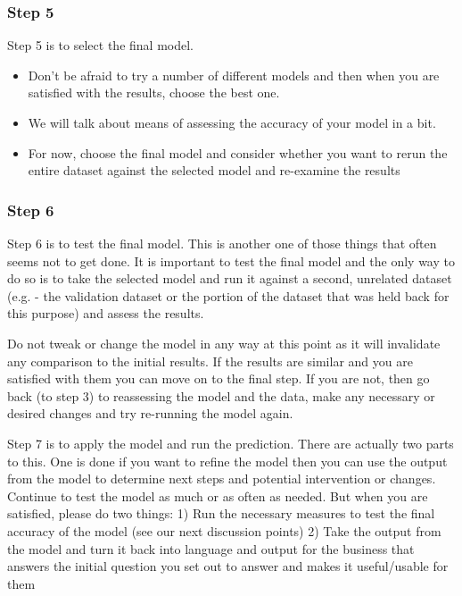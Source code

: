 \documentclass[PredictiveAnalytics101.tex]{subfiles}
\begin{document}
\begin{frame}
\frametitle{Step 5} 
Step 5 is to select the final model.
\begin{itemize}
\item Don’t be afraid to try a number of different models and then when
you are satisfied with the results, choose the best one.
\item  We will talk about means of assessing the
accuracy of your model in a bit.
\item For now, choose the final model and consider whether you want to rerun
the entire dataset against the selected model and re-examine the results
\end{itemize} 
\end{frame}
\begin{frame}
\frametitle{Step 6}
Step 6 is to test the final model. This is another one of those things that often seems not to get done.
It is important to test the final model and the only way to do so is to take the selected model and run it
against a second, unrelated dataset (e.g. - the validation dataset or the portion of the dataset that was
held back for this purpose) and assess the results.
\end{frame}
\begin{frame}
Do not tweak or change the model in any way at this
point as it will invalidate any comparison to the initial results. If the results are similar and you are
satisfied with them you can move on to the final step. If you are not, then go back (to step 3) to
reassessing the model and the data, make any necessary or desired changes and try re-running the
model again.
\end{frame}
\begin{frame}
Step 7 is to apply the model and run the prediction. There are actually two parts to this. One is done if
you want to refine the model then you can use the output from the model to determine next steps and
potential intervention or changes. Continue to test the model as much or as often as needed. But when
you are satisfied, please do two things:
1) Run the necessary measures to test the final accuracy of the model (see our next discussion
points)
2) Take the output from the model and turn it back into language and output for the business
that answers the initial question you set out to answer and makes it useful/usable for them 
\end{frame}
\end{document}
